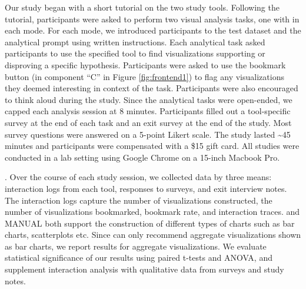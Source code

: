 Our study began with a short tutorial on the two study tools.
Following the tutorial, participants were asked to perform two visual analysis 
tasks, one with \SeeDB in each mode.
For each mode, we introduced participants to the test dataset
and the analytical prompt using written instructions.
Each analytical task asked participants to use the specified tool to find 
visualizations supporting or disproving a specific hypothesis.
Participants were asked to use the bookmark button (in component ``C'' in Figure 
\ref{fig:frontend1}) to flag any visualizations they deemed interesting in
context of the task.
Participants were also encouraged to think aloud during the study.
Since the analytical tasks were open-ended, we capped each analysis session at 8 minutes.
Participants filled out a tool-specific survey at the end of each task and
an exit survey at the end of the study.
Most survey questions were answered on a 5-point Likert scale.
The study lasted \textasciitilde 45 minutes and participants were compensated 
 with a \$15 gift card.
All studies were conducted in a lab setting using Google Chrome on a 15-inch 
Macbook Pro.

.
Over the course of each study session, we collected data by three means: interaction logs 
from each tool, responses to surveys, and exit interview notes.
The interaction logs capture the number of visualizations
constructed, the number of visualizations bookmarked, bookmark rate, and interaction traces.
\SeeDB and MANUAL both support the construction of different types of charts such as bar 
charts, scatterplots etc.
Since \SeeDB can only recommend aggregate visualizations shown as bar charts,
we report results for aggregate visualizations.
We evaluate statistical significance of our results using paired t-tests and ANOVA,
and supplement interaction analysis with qualitative data from surveys and study notes.



